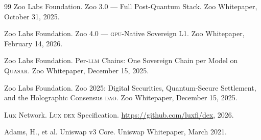 \documentclass[11pt,letterpaper]{article}
\newcommand{\Lux}{\textsc{Lux}}
\newcommand{\Quasar}{\textsc{Quasar}}
\newcommand{\LLM}{\textsc{llm}}
\newcommand{\GPU}{\textsc{gpu}}
\newcommand{\DAO}{\textsc{dao}}
\newcommand{\DEX}{\textsc{dex}}
\begin{document}
\begin{thebibliography}{99}
Zoo Labs Foundation.
\newblock Zoo 3.0 --- Full Post-Quantum Stack.
\newblock Zoo Whitepaper, October 31, 2025.

Zoo Labs Foundation.
\newblock Zoo 4.0 --- \GPU{}-Native Sovereign L1.
\newblock Zoo Whitepaper, February 14, 2026.

Zoo Labs Foundation.
\newblock Per-\LLM{} Chains: One Sovereign Chain per Model on \Quasar{}.
\newblock Zoo Whitepaper, December 15, 2025.

Zoo Labs Foundation.
\newblock Zoo 2025: Digital Securities, Quantum-Secure Settlement, and the Holographic Consensus \DAO{}.
\newblock Zoo Whitepaper, December 15, 2025.

Lux Network.
\newblock \Lux{} \DEX{} Specification.
\newblock \url{https://github.com/luxfi/dex}, 2026.

Adams, H., et al.
\newblock Uniswap v3 Core.
\newblock Uniswap Whitepaper, March 2021.

\end{thebibliography}
\end{document}
